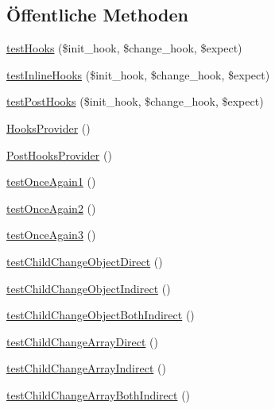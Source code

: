 \subsection*{Öffentliche Methoden}
\begin{DoxyCompactItemize}
\item 
\hyperlink{classTests_1_1Feature_1_1ObjectHookTest_ab45080be4fb0350524c2c682a6193485}{test\+Hooks} (\$init\+\_\+hook, \$change\+\_\+hook, \$expect)
\item 
\hyperlink{classTests_1_1Feature_1_1ObjectHookTest_a0f55debc8bea14bdd1f588ac9e0e7187}{test\+Inline\+Hooks} (\$init\+\_\+hook, \$change\+\_\+hook, \$expect)
\item 
\hyperlink{classTests_1_1Feature_1_1ObjectHookTest_a9cee75cbb5c313eb173432ac0a26f1de}{test\+Post\+Hooks} (\$init\+\_\+hook, \$change\+\_\+hook, \$expect)
\item 
\hyperlink{classTests_1_1Feature_1_1ObjectHookTest_a42355a787adceb910693c97e220c7110}{Hooks\+Provider} ()
\item 
\hyperlink{classTests_1_1Feature_1_1ObjectHookTest_a272e4a02fe50a99ce5a26bc07421dd98}{Post\+Hooks\+Provider} ()
\item 
\hyperlink{classTests_1_1Feature_1_1ObjectHookTest_abe1afe2abec1950ea8c82c19d1651222}{test\+Once\+Again1} ()
\item 
\hyperlink{classTests_1_1Feature_1_1ObjectHookTest_a9084ab71c3679ab359dbefd6e06a3619}{test\+Once\+Again2} ()
\item 
\hyperlink{classTests_1_1Feature_1_1ObjectHookTest_a934a9d6aacfb8d2a6787d7c0377e5b73}{test\+Once\+Again3} ()
\item 
\hyperlink{classTests_1_1Feature_1_1ObjectHookTest_aac6de07b6249e7b07e57a5148255e89f}{test\+Child\+Change\+Object\+Direct} ()
\item 
\hyperlink{classTests_1_1Feature_1_1ObjectHookTest_a6562028996091847e31f193afad15fbe}{test\+Child\+Change\+Object\+Indirect} ()
\item 
\hyperlink{classTests_1_1Feature_1_1ObjectHookTest_a3a71f411f76fab59fe7727d6e7513b68}{test\+Child\+Change\+Object\+Both\+Indirect} ()
\item 
\hyperlink{classTests_1_1Feature_1_1ObjectHookTest_ab5e0cb28bec418330a510003e4221f7b}{test\+Child\+Change\+Array\+Direct} ()
\item 
\hyperlink{classTests_1_1Feature_1_1ObjectHookTest_a7966074edf3d7c9198a6e87c25652be8}{test\+Child\+Change\+Array\+Indirect} ()
\item 
\hyperlink{classTests_1_1Feature_1_1ObjectHookTest_a08bd9904a1420b5e2f582492e0ab13a0}{test\+Child\+Change\+Array\+Both\+Indirect} ()
\end{DoxyCompactItemize}
